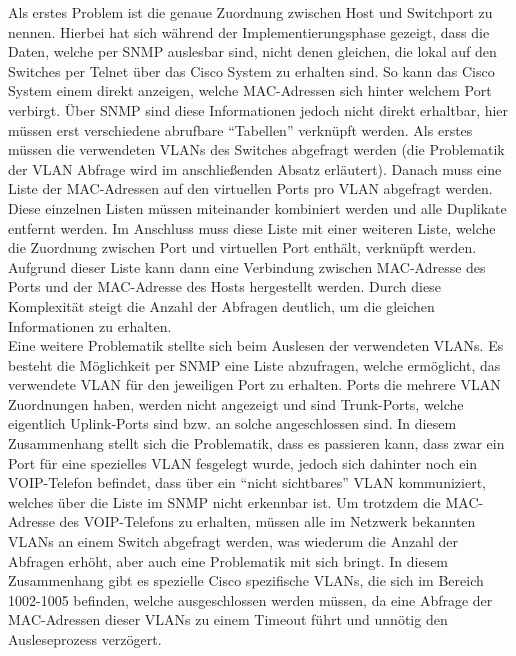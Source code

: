 Als erstes Problem ist die genaue Zuordnung zwischen Host und Switchport zu nennen.
Hierbei hat sich während der Implementierungsphase gezeigt, dass die Daten, welche per SNMP auslesbar sind, nicht denen gleichen, die lokal auf den Switches per Telnet über das Cisco System zu erhalten sind. So kann das Cisco System einem direkt anzeigen, welche MAC-Adressen sich hinter welchem Port verbirgt. Über SNMP sind diese Informationen jedoch nicht direkt erhaltbar, hier müssen erst verschiedene abrufbare “Tabellen” verknüpft werden. Als erstes müssen die verwendeten VLANs des Switches abgefragt werden (die Problematik der VLAN Abfrage wird im anschließenden Absatz erläutert). Danach muss eine Liste der MAC-Adressen auf den virtuellen Ports pro VLAN abgefragt werden. Diese einzelnen Listen müssen miteinander kombiniert werden und alle Duplikate entfernt werden. Im Anschluss muss diese Liste mit einer weiteren Liste, welche die Zuordnung zwischen Port und virtuellen Port enthält, verknüpft werden. Aufgrund dieser Liste kann dann eine Verbindung zwischen MAC-Adresse des Ports und der MAC-Adresse des Hosts hergestellt werden. Durch diese Komplexität steigt die Anzahl der Abfragen deutlich, um die gleichen Informationen zu erhalten.\\
Eine weitere Problematik stellte sich beim Auslesen der verwendeten VLANs. Es besteht die Möglichkeit per SNMP eine Liste abzufragen, welche ermöglicht, das verwendete VLAN für den jeweiligen Port zu erhalten. Ports die mehrere VLAN Zuordnungen haben, werden nicht angezeigt und sind Trunk-Ports, welche eigentlich Uplink-Ports sind bzw. an solche angeschlossen sind. In diesem Zusammenhang stellt sich die Problematik, dass es passieren kann, dass zwar ein Port für eine spezielles VLAN fesgelegt wurde, jedoch sich dahinter noch ein VOIP-Telefon befindet, dass über ein “nicht sichtbares” VLAN kommuniziert, welches über die Liste im SNMP nicht erkennbar ist. Um trotzdem die MAC-Adresse des VOIP-Telefons zu erhalten, müssen alle im Netzwerk bekannten VLANs an einem Switch abgefragt werden, was wiederum die Anzahl der Abfragen erhöht, aber auch eine Problematik mit sich bringt. In diesem Zusammenhang gibt es spezielle Cisco spezifische VLANs, die sich im Bereich 1002-1005 befinden, welche ausgeschlossen werden müssen, da eine Abfrage der MAC-Adressen dieser VLANs zu einem Timeout führt und unnötig den Ausleseprozess verzögert.\\
